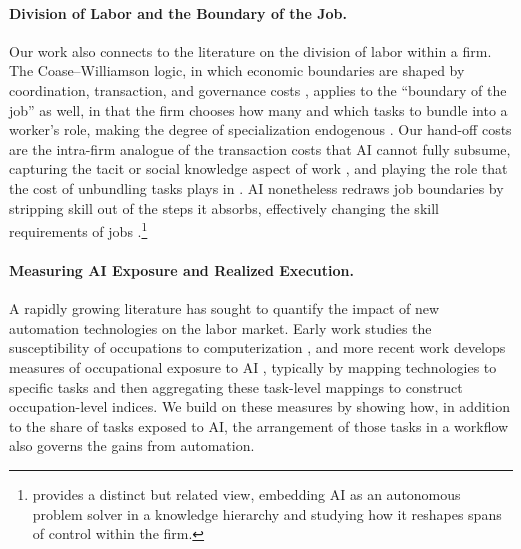 \paragraph{Division of Labor and the Boundary of the Job.}
Our work also connects to the literature on the division of labor within a firm.
The Coase--Williamson logic, in which economic boundaries are shaped by coordination, transaction, and governance costs \citep{coase1937nature, williamson1971vertical, williamson1979transaction}, applies to the ``boundary of the job'' as well, in that the firm chooses how many and which tasks to bundle into a worker's role, making the degree of specialization endogenous \citep{murphy1986specialization, becker1992division, dessein2006adaptive}.
Our hand-off costs are the intra-firm analogue of the transaction costs that AI cannot fully subsume, capturing the tacit or social knowledge aspect of work \citep{deming2017growing}, and playing the role that the cost of unbundling tasks plays in \citet{garicano2026weak}. 
AI nonetheless redraws job boundaries by stripping skill out of the steps it absorbs, effectively changing the skill requirements of jobs \citep{autor2024new, autor2025expertise, autor2026makes}.\footnote{
\cite{ide2025ai} provides a distinct but related view, embedding AI as an autonomous problem solver in a knowledge hierarchy \citep{garicano2000hierarchies, garicano2006organization} and studying how it reshapes spans of control within the firm.
}


\paragraph{Measuring AI Exposure and Realized Execution.}
A rapidly growing literature has sought to quantify the impact of new automation technologies on the labor market.
Early work studies the susceptibility of occupations to computerization \citep{frey2017future}, and more recent work develops measures of occupational exposure to AI \citep{brynjolfsson2018can, webb2020impact, felten2021occupational, eloundou2023gpts, hampole2025artificial, tomlinson2025working}, typically by mapping technologies to specific tasks and then aggregating these task-level mappings to construct occupation-level indices.
We build on these measures by showing how, in addition to the share of tasks exposed to AI, the arrangement of those tasks in a workflow also governs the gains from automation.